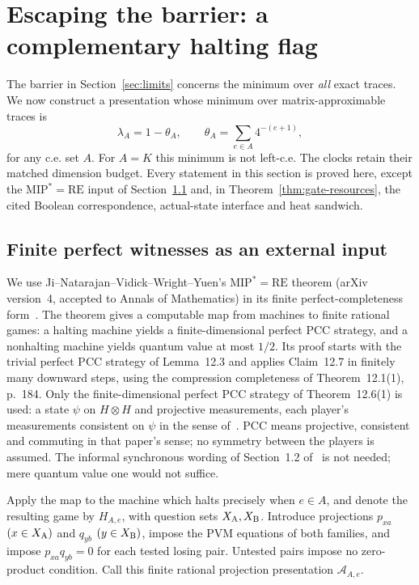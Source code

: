 \section{Escaping the barrier: a complementary halting flag}\label{sec:gate}
The barrier in Section~\ref{sec:limits} concerns the minimum over \emph{all} exact traces. We now construct a presentation whose minimum over matrix-approximable traces is
\[
 \lambda_A=1-\theta_A,\qquad \theta_A=\sum_{e\in A}4^{-(e+1)},
\]
for any c.e. set $A$. For $A=K$ this minimum is not left-c.e. The clocks retain their matched dimension budget. Every statement in this section is proved here, except the $\mathrm{MIP}^*=\mathrm{RE}$ input of Section~\ref{sec:gate-input} and, in Theorem~\ref{thm:gate-resources}, the cited Boolean correspondence, actual-state interface and heat sandwich.

\subsection{Finite perfect witnesses as an external input}\label{sec:gate-input}
We use Ji--Natarajan--Vidick--Wright--Yuen's $\mathrm{MIP}^*=\mathrm{RE}$ theorem (arXiv version~4, accepted to Annals of Mathematics) in its finite perfect-completeness form~\cite[Theorem~12.6, pp.~193--194]{JNVWY}. The theorem gives a computable map from machines to finite rational games: a halting machine yields a finite-dimensional perfect PCC strategy, and a nonhalting machine yields quantum value at most $1/2$. Its proof starts with the trivial perfect PCC strategy of Lemma~12.3 and applies Claim~12.7 in finitely many downward steps, using the compression completeness of Theorem~12.1(1), p.~184. Only the finite-dimensional perfect PCC strategy of Theorem~12.6(1) is used: a state $\psi$ on $H\otimes H$ and projective measurements, each player's measurements consistent on $\psi$ in the sense of~\cite[Definition~5.10]{JNVWY}. PCC means projective, consistent and commuting in that paper's sense; no symmetry between the players is assumed. The informal synchronous wording of Section~1.2 of~\cite{JNVWY} is not needed; mere quantum value one would not suffice.

Apply the map to the machine which halts precisely when $e\in A$, and denote the resulting game by $H_{A,e}$, with question sets $X_{\rm A},X_{\rm B}$. Introduce projections $p_{xa}$ $(x\in X_{\rm A})$ and $q_{yb}$ $(y\in X_{\rm B})$, impose the PVM equations of both families, and impose $p_{xa}q_{yb}=0$ for each tested losing pair. Untested pairs impose no zero-product condition. Call this finite rational projection presentation $\mathcal A_{A,e}$.

